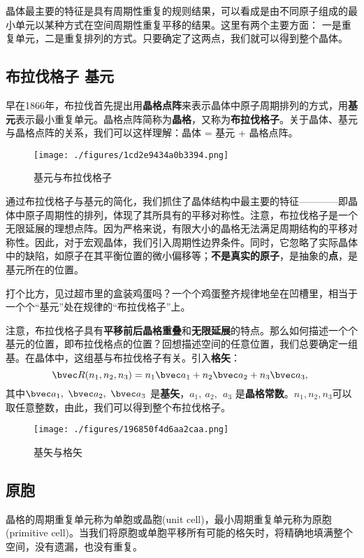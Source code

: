 
晶体最主要的特征是具有周期性重复的规则结果，可以看成是由不同原子组成的最小单元以某种方式在空间周期性重复平移的结果。这里有两个主要方面：
一是重复单元，二是重复排列的方式。只要确定了这两点，我们就可以得到整个晶体。

\subsection{布拉伐格子 基元}
早在1866年，布拉伐首先提出用\textbf{晶格点阵}来表示晶体中原子周期排列的方式，用\textbf{基元}表示最小重复单元。晶格点阵简称为\textbf{晶格}，又称为\textbf{布拉伐格子}。关于晶体、基元与晶格点阵的关系，我们可以这样理解：晶体 = 基元 + 晶格点阵。
\begin{figure}[ht]
\centering
\texttt{[image: ./figures/1cd2e9434a0b3394.png]}
\caption{ 基元与布拉伐格子} \label{fig_BraLat_1}
\end{figure}

通过布拉伐格子与基元的简化，我们抓住了晶体结构中最主要的特征————即晶体中原子周期性的排列，体现了其所具有的平移对称性。注意，布拉伐格子是一个无限延展的理想点阵。因为严格来说，有限大小的晶格无法满足周期结构的平移对称性。因此，对于宏观晶体，我们引入周期性边界条件。同时，它忽略了实际晶体中的缺陷，如原子在其平衡位置的微小偏移等；\textbf{不是真实的原子}，是抽象的\textbf{点}，是基元所在的位置。

打个比方，见过超市里的盒装鸡蛋吗？一个个鸡蛋整齐规律地垒在凹槽里，相当于一个个“基元”处在规律的“布拉伐格子”上。

注意，布拉伐格子具有\textbf{平移前后晶格重叠}和\textbf{无限延展}的特点。那么如何描述一个个基元的位置，即布拉伐格点的位置？回想描述空间的任意位置，我们总要确定一组基。在晶体中，这组基与布拉伐格子有关。引入\textbf{格矢}：
\begin{equation}
\bvec R(n_1, n_2, n_3) = n_1 \bvec a_1 + n_2 \bvec a_2 + n_3 \bvec a_3,~ 
\end{equation}
其中$\bvec a_1,~\bvec a_2,~\bvec a_3$ 是\textbf{基矢}，$a_1,~ a_2,~\ a_3$ 是\textbf{晶格常数}。$n_1, n_2, n_3$可以取任意整数，由此，我们可以得到整个布拉伐格子。

\begin{figure}[ht]
\centering
\texttt{[image: ./figures/196850f4d6aa2caa.png]}
\caption{基矢与格矢} \label{fig_BraLat_2}
\end{figure}

\subsection{原胞}
晶格的周期重复单元称为单胞或晶胞(unit cell)，最小周期重复单元称为原胞(primitive cell)。当我们将原胞或单胞平移所有可能的格矢时，将精确地填满整个空间，没有遗漏，也没有重复。